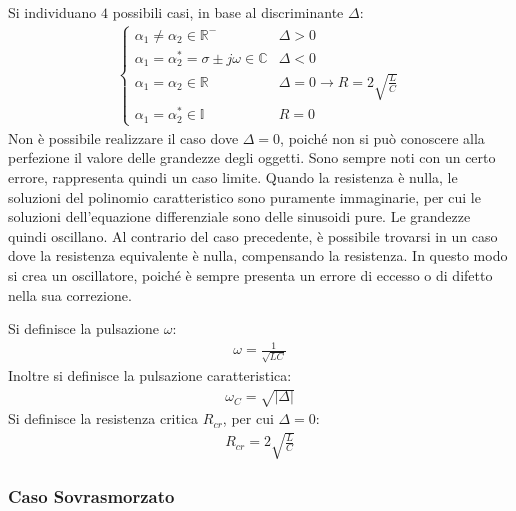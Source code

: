 \documentclass{article}
\numberwithin{equation}{subsection}
\begin{document}
Si individuano $4$ possibili casi, in base al discriminante $\Delta$:
\begin{gather*}
    \begin{cases}
        \alpha_1\neq\alpha_2\in\mathbb{R}^-&\Delta>0\\
        \alpha_1=\alpha_2^*=\sigma\pm j\omega\in\mathbb{C}&\Delta<0\\
        \alpha_1=\alpha_2\in\mathbb{R}&\Delta=0\to R=2\displaystyle\sqrt{\frac{L}{C}}\\
        \alpha_1=\alpha_2^*\in\mathbb{I}&R=0
    \end{cases}
\end{gather*}
Non è possibile realizzare il caso dove $\Delta=0$, poiché non si può conoscere alla perfezione il valore delle grandezze degli oggetti. Sono sempre noti con un certo 
errore, rappresenta quindi un caso limite. 
Quando la resistenza è nulla, le soluzioni del polinomio caratteristico sono puramente immaginarie, per cui le soluzioni dell'equazione differenziale sono delle sinusoidi pure. 
Le grandezze quindi oscillano. 
Al contrario 
del caso precedente, è possibile trovarsi in un caso dove la resistenza equivalente è nulla, compensando la resistenza. In questo modo si crea un oscillatore, poiché è 
sempre presenta un errore di eccesso o di difetto nella sua correzione. 

Si definisce la pulsazione $\omega$:
\begin{gather*}
    \omega=\displaystyle\frac{1}{\sqrt{LC}}
\end{gather*}
Inoltre si definisce la pulsazione caratteristica:
\begin{gather*}
    \omega_C=\sqrt{|\Delta|}
\end{gather*}
Si definisce la resistenza critica $R_{cr}$, per cui $\Delta=0$:
\begin{gather*}
    R_{cr}=2\displaystyle\sqrt{\frac{L}{C}}
\end{gather*}

\subsubsection{Caso Sovrasmorzato}
\end{document}
